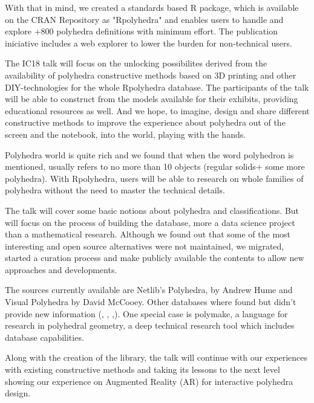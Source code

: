 \documentclass[a4paper,10pt]{article}
\begin{document}
With that in mind, we created a standards based R package, which is available on the CRAN Repository as "Rpolyhedra" and enables users to handle and explore +800 polyhedra definitions with minimum effort. The publication iniciative includes a web explorer \cite{RPOLY_EXPLORER} to lower the burden for non-technical users.


The IC18 talk will focus on the unlocking possibilites derived from the availability of polyhedra constructive methods based on 3D printing and other DIY-technologies for the whole Rpolyhedra database. The participants of the talk will be able to construct from the models available for their exhibits, providing educational resources as well. And we hope, to imagine, design and share different constructive methods to improve the experience about polyhedra out of the screen and the notebook, into the world, playing with the hands.

Polyhedra world is quite rich and we found that when the word polyhedron is mentioned, usually refers to no more than 10 objects (regular solids+ some more polyhedra). With Rpolyhedra, users will be able to research on whole families of polyhedra without the need to master the technical details.

The talk will cover some basic notions about polyhedra and classifications. But will focus on the process of building the database, more a data science project than a mathematical research. Although we found out that some of the most interesting and open source alternatives were not maintained, we migrated, started a curation process and make publicly available the contents to allow new approaches and developments.

The sources currently available are Netlib's Polyhedra\cite{NETLIB}, by Andrew Hume and Visual Polyhedra\cite{DMCCOOEY} by David McCooey. Other databases where found but didn't provide new information (\cite{NAT_ALISON}, \cite{GEORGE_HART}, \cite{WOLFRAM_ALPHA_TETRA},\cite{WIKIPEDIA_TETRA}). One special case is polymake\cite{POLYMAKE}, a language for research in polyhedral geometry, a deep technical research tool which includes database capabilities. 


Along with the creation of the library, the talk will continue with our experiences with existing constructive methods and taking its lessons to the next level showing our experience on Augmented Reality (AR) for interactive polyhedra design. 



\end{document}
